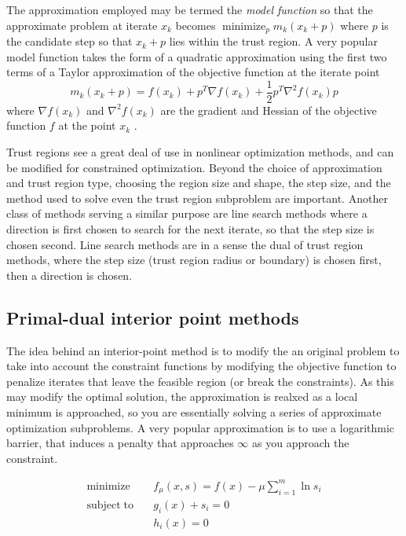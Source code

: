 The approximation employed may be termed the \emph{model function} so that the approximate problem at iterate $x_k$ becomes $\operatorname{minimize}_p m_k(x_k + p)$ where $p$ is the candidate step so that $x_k + p$ lies within the trust region. A very popular model function takes the form of a quadratic approximation using the first two terms of a Taylor approximation of the objective function at the iterate point
\begin{equation}
  m_k(x_k + p) = f(x_k) + p^T \nabla f(x_k) + \frac{1}{2} p^T \nabla^2 f(x_k) p
\end{equation}
where $\nabla f(x_k)$ and $\nabla^2 f(x_k)$ are the gradient and Hessian of the objective function $f$ at the point $x_k$ \citep{More83}.

Trust regions see a great deal of use in nonlinear optimization methods, and can be modified for constrained optimization. Beyond the choice of approximation and trust region type, choosing the region size and shape, the step size, and the method used to solve even the trust region subproblem are important. Another class of methods serving a similar purpose are line search methods where a direction is first chosen to search for the next iterate, so that the step size is chosen second. Line search methods are in a sense the dual of trust region methods, where the step size (trust region radius or boundary) is chosen first, then a direction is chosen.

\subsection{Primal-dual interior point methods}
The idea behind an interior-point method is to modify the an original problem to take into account the constraint functions by modifying the objective function to penalize iterates that leave the feasible region (or break the constraints). As this may modify the optimal solution, the approximation is realxed as a local minimum is approached, so you are essentially solving a series of approximate optimization subproblems. A very popular approximation is to use a logarithmic barrier, that induces a penalty that approaches $\infty$ as you approach the constraint.

\begin{align} \label{eq:dualop}
\mathrm{minimize} \quad & f_\mu(x,s) = f(x) - \mu \sum_{i=1}^{m} \ln s_i \nonumber \\
\mathrm{subject\;to} \quad & g_i(x) + s_i = 0 \\
                           & h_i(x) = 0 \nonumber
\end{align}

